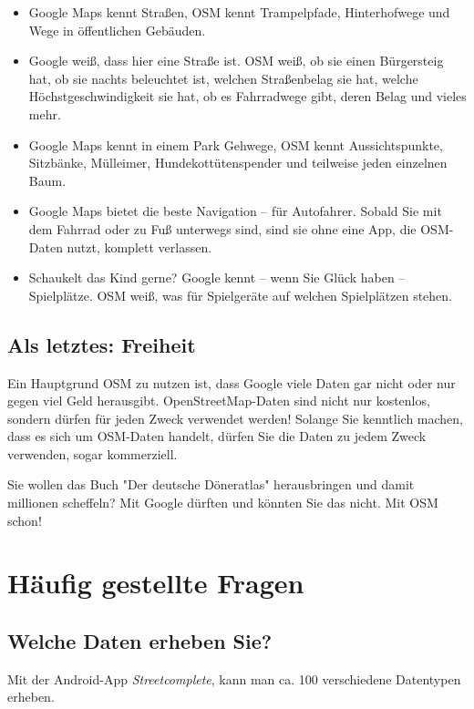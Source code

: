 \documentclass[10pt,foldmark,notumble]{leaflet}
\begin{document}
    \begin{itemize}[noitemsep,topsep=0pt]
        \item Google Maps kennt Straßen, OSM kennt Trampelpfade, Hinterhofwege und Wege in öffentlichen Gebäuden.
        \item Google weiß, dass hier eine Straße ist.
        OSM weiß, ob sie einen Bürgersteig hat, ob sie nachts beleuchtet ist, welchen Straßenbelag sie hat, welche Höchstgeschwindigkeit sie hat, ob es Fahrradwege gibt, deren Belag und vieles mehr.
        \item Google Maps kennt in einem Park Gehwege, OSM kennt Aussichtspunkte, Sitzbänke, Mülleimer, Hundekottütenspender und teilweise jeden einzelnen Baum.
        \item Google Maps bietet die beste Navigation -- für Autofahrer.
        Sobald Sie mit dem Fahrrad oder zu Fuß unterwegs sind, sind sie ohne eine App, die OSM-Daten nutzt, komplett verlassen.
        \item Schaukelt das Kind gerne? Google kennt -- wenn Sie Glück haben -- Spielplätze.
        OSM weiß, was für Spielgeräte auf welchen Spielplätzen stehen.
    \end{itemize}

    \subsection{Als letztes: Freiheit}
    Ein Hauptgrund OSM zu nutzen ist, dass Google viele Daten gar nicht oder nur gegen viel Geld herausgibt.
    OpenStreetMap-Daten sind nicht nur kostenlos, sondern dürfen für jeden Zweck verwendet werden! Solange Sie kenntlich machen, dass es sich um OSM-Daten handelt, dürfen Sie die Daten zu jedem Zweck verwenden, sogar kommerziell.

    Sie wollen das Buch "Der deutsche Döneratlas" herausbringen und damit millionen scheffeln?
    Mit Google dürften und könnten Sie das nicht.
    Mit OSM schon!


    \section{Häufig gestellte Fragen}
    \subsection{Welche Daten erheben Sie?}
    Mit der Android-App \textit{Streetcomplete}, kann man ca. 100 verschiedene Datentypen erheben.
\end{document}
